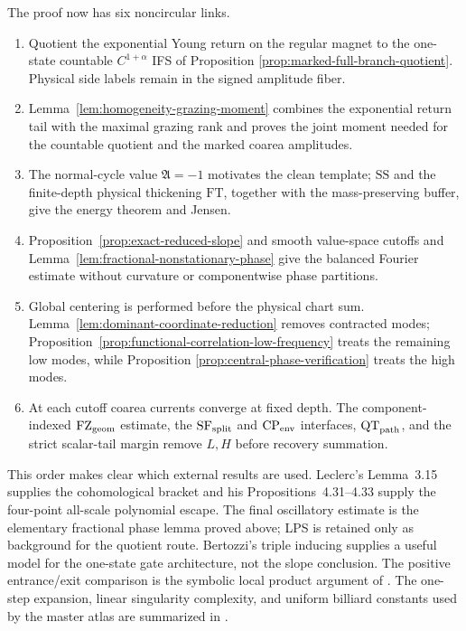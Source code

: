 \documentclass[11pt]{article}
\begin{document}
The proof now has six noncircular links.
\begin{enumerate}[label=\textup{(F\arabic*)}]
\item Quotient the exponential Young return on the regular magnet to the
      one-state countable $C^{1+\alpha}$ IFS of Proposition
      \ref{prop:marked-full-branch-quotient}.  Physical side labels remain
      in the signed amplitude fiber.
\item Lemma~\ref{lem:homogeneity-grazing-moment} combines the exponential
      return tail with the maximal grazing rank and proves the joint moment
      needed for the countable quotient and the marked coarea amplitudes.
\item The normal-cycle value $\mathfrak A=-1$ motivates the clean template;
      $\mathrm{SS}$ and the finite-depth physical thickening $\mathrm{FT}$, together
      with the mass-preserving buffer, give the energy theorem and Jensen.
\item Proposition~\ref{prop:exact-reduced-slope} and smooth value-space
      cutoffs and Lemma~\ref{lem:fractional-nonstationary-phase} give the
      balanced Fourier estimate without curvature or componentwise phase
      partitions.
\item Global centering is performed before the physical chart sum.
      Lemma~\ref{lem:dominant-coordinate-reduction} removes contracted modes;
      Proposition~\ref{prop:functional-correlation-low-frequency} treats the
      remaining low modes, while Proposition
      \ref{prop:central-phase-verification} treats the high modes.
\item At each cutoff coarea currents converge at fixed depth.  The
      component-indexed $\mathrm{FZ}_{\rm geom}$ estimate, the
      $\mathrm{SF}_{\rm split}$ and $\mathrm{CP}_{\rm env}$ interfaces,
      $\mathrm{QT}_{\rm path}$, and the strict scalar-tail margin remove
      $L,H$ before recovery summation.
\end{enumerate}

This order makes clear which external results are used.  Leclerc's
Lemma~3.15 supplies the cohomological bracket and his
Propositions~4.31--4.33 supply the four-point all-scale polynomial escape.
The final oscillatory estimate is the elementary fractional phase lemma
proved above; LPS is retained only as background for the quotient route.
Bertozzi's triple inducing supplies a useful model for the one-state gate
architecture, not the slope conclusion.  The positive entrance/exit comparison is the symbolic local
product argument of \cite{ClimenhagaLPS}.  The
one-step expansion, linear singularity complexity, and uniform billiard
constants used by the master atlas are summarized in \cite{DLreview}.
\end{document}
